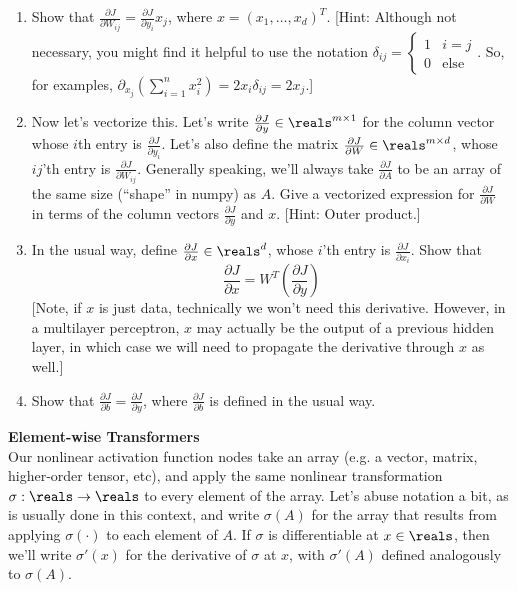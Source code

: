 \documentclass{article}
\newcommand{\nyuparagraph}[1]{\vspace{0.3cm}\textcolor{nyupurple}{\bf \large #1}\\}
\theoremstyle{plain}
\theoremstyle{definition}
\begin{document}
\begin{enumerate}
\setcounter{enumi}{\value{saveenum}}
\item Show that $\frac{\partial J}{\partial W_{ij}}=\frac{\partial J}{\partial y_{i}}x_{j}$,
where $x=\left(x_{1},\ldots,x_{d}\right)^{T}$. {[}Hint: Although
not necessary, you might find it helpful to use the notation $\delta_{ij}=\begin{cases}
1 & i=j\\
0 & \text{else}
\end{cases}$. So, for examples, $\partial_{x_{j}}\left(\sum_{i=1}^{n}x_{i}^{2}\right)=2x_{i}\delta_{ij}=2x_{j}$.{]}

\item Now let's vectorize this. Let's write $\frac{\partial J}{\partial y}\in\reals^{m\times1}$
for the column vector whose $i$th entry is $\frac{\partial J}{\partial y_{i}}$.
Let's also define the matrix $\frac{\partial J}{\partial W}\in\reals^{m\times d}$,
whose $ij$'th entry is $\frac{\partial J}{\partial W_{ij}}$. Generally
speaking, we'll always take $\frac{\partial J}{\partial A}$ to be
an array of the same size (``shape'' in numpy) as $A$. Give a vectorized
expression for $\frac{\partial J}{\partial W}$ in terms of the column
vectors $\frac{\partial J}{\partial y}$ and $x$. {[}Hint: Outer
product.{]}\\

\item In the usual way, define $\frac{\partial J}{\partial x}\in\reals^{d}$,
whose $i$'th entry is $\frac{\partial J}{\partial x_{i}}$. Show
that 
\[
\frac{\partial J}{\partial x}=W^{T}\left(\frac{\partial J}{\partial y}\right)
\]
{[}Note, if $x$ is just data, technically we won't need this derivative.
However, in a multilayer perceptron, $x$ may actually be the output
of a previous hidden layer, in which case we will need to propagate
the derivative through $x$ as well.{]} \\


\item Show that $\frac{\partial J}{\partial b}=\frac{\partial J}{\partial y}$,
where $\frac{\partial J}{\partial b}$ is defined in the usual way.\\

\setcounter{saveenum}{\value{enumi}}
\end{enumerate}


\nyuparagraph{Element-wise Transformers}

Our nonlinear activation function nodes take an array (e.g. a vector,
matrix, higher-order tensor, etc), and apply the same nonlinear transformation
$\sigma:\reals\to\reals$ to every element of the array. Let's abuse
notation a bit, as is usually done in this context, and write $\sigma(A)$
for the array that results from applying $\sigma(\cdot)$ to each
element of $A$. If $\sigma$ is differentiable at $x\in\reals$,
then we'll write $\sigma'(x)$ for the derivative of $\sigma$ at
$x$, with $\sigma'(A)$ defined analogously to $\sigma(A)$.
\end{document}
